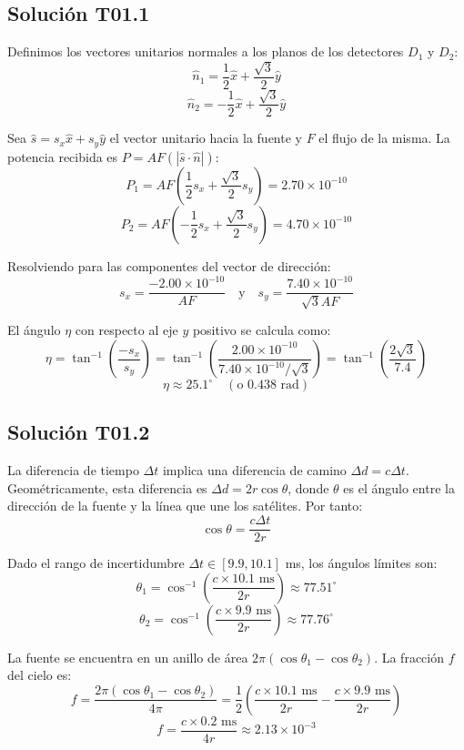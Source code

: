 \documentclass{article}
\begin{document}
\subsection{Solución T01.1}

Definimos los vectores unitarios normales a los planos de los detectores $D_1$ y $D_2$:
$$\hat{n}_1 = \frac{1}{2} \hat{x} + \frac{\sqrt{3}}{2} \hat{y}$$
$$\hat{n}_2 = -\frac{1}{2} \hat{x} + \frac{\sqrt{3}}{2} \hat{y}$$

Sea $\hat{s} = s_x \hat{x} + s_y \hat{y}$ el vector unitario hacia la fuente y $F$ el flujo de la misma. La potencia recibida es $P = AF (|\hat{s} \cdot \hat{n}|)$:
$$P_1 = AF \left( \frac{1}{2} s_x + \frac{\sqrt{3}}{2} s_y \right) = 2.70 \times 10^{-10}$$
$$P_2 = AF \left( -\frac{1}{2} s_x + \frac{\sqrt{3}}{2} s_y \right) = 4.70 \times 10^{-10}$$

Resolviendo para las componentes del vector de dirección:
$$s_x = \frac{-2.00 \times 10^{-10}}{AF} \quad \text{y} \quad s_y = \frac{7.40 \times 10^{-10}}{\sqrt{3} AF}$$

El ángulo $\eta$ con respecto al eje $y$ positivo se calcula como:
$$\eta = \tan^{-1} \left( \frac{-s_x}{s_y} \right) = \tan^{-1} \left( \frac{2.00 \times 10^{-10}}{7.40 \times 10^{-10} / \sqrt{3}} \right) = \tan^{-1} \left( \frac{2 \sqrt{3}}{7.4} \right)$$
$$\eta \approx 25.1^\circ \quad (\text{o } 0.438 \text{ rad})$$

\subsection{Solución T01.2}

La diferencia de tiempo $\Delta t$ implica una diferencia de camino $\Delta d = c \Delta t$. Geométricamente, esta diferencia es $\Delta d = 2r \cos \theta$, donde $\theta$ es el ángulo entre la dirección de la fuente y la línea que une los satélites. Por tanto:
$$\cos \theta = \frac{c \Delta t}{2r}$$

Dado el rango de incertidumbre $\Delta t \in [9.9, 10.1]$ ms, los ángulos límites son:
$$\theta_1 = \cos^{-1} \left( \frac{c \times 10.1 \text{ ms}}{2r} \right) \approx 77.51^\circ$$
$$\theta_2 = \cos^{-1} \left( \frac{c \times 9.9 \text{ ms}}{2r} \right) \approx 77.76^\circ$$

La fuente se encuentra en un anillo de área $2\pi(\cos \theta_1 - \cos \theta_2)$. La fracción $f$ del cielo es:
$$f = \frac{2\pi(\cos \theta_1 - \cos \theta_2)}{4\pi} = \frac{1}{2} \left( \frac{c \times 10.1 \text{ ms}}{2r} - \frac{c \times 9.9 \text{ ms}}{2r} \right)$$
$$f = \frac{c \times 0.2 \text{ ms}}{4r} \approx 2.13 \times 10^{-3}$$
\end{document}
